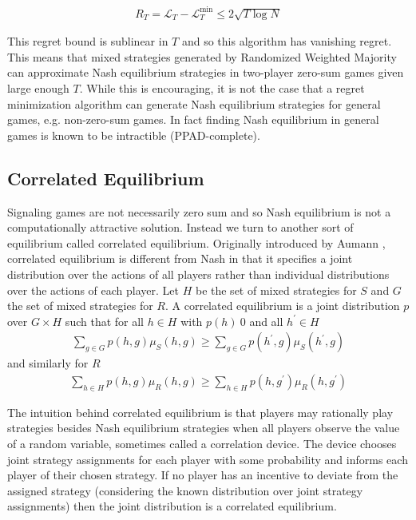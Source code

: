 \documentclass{article}
\begin{document}
\begin{align*}
R_T = \mathcal{L}_T - \mathcal{L}_T^{\text{min}} \le 2\sqrt{T \log N}
\end{align*}

This regret bound is sublinear in $T$ and so this algorithm has vanishing regret. This means that mixed strategies generated by Randomized Weighted Majority can approximate Nash equilibrium strategies in two-player zero-sum games given large enough $T$. While this is encouraging, it is not the case that a regret minimization algorithm can generate Nash equilibrium strategies for general games, e.g. non-zero-sum games. In fact finding Nash equilibrium in general games is known to be intractible (PPAD-complete\cite{daskalakis2009complexity}).

\subsection{Correlated Equilibrium}


Signaling games are not necessarily zero sum and so Nash equilibrium is not a computationally attractive solution. Instead we turn to another sort of equilibrium called correlated equilibrium. Originally introduced by Aumann \cite{aumann1974subjectivity}\cite{aumann1987correlated}, correlated equilibrium is different from Nash in that it specifies a joint distribution over the actions of all players rather than individual distributions over the actions of each player. Let $H$ be the set of mixed strategies for $S$ and $G$ the set of mixed strategies for $R$. A correlated equilibrium is a joint distribution $p$ over $G \times H$ such that for all $h\in H$ with $p(h) \> 0$ and all $h^\prime \in H$
\begin{align*}
\sum_{g \in G} p(h,g)\mu_S(h, g) \ge \sum_{g \in G} p(h^\prime,g)\mu_S(h^\prime, g)
\end{align*}
\noindent and similarly for $R$
\begin{align*}
\sum_{h \in H} p(h,g)\mu_R(h, g) \ge \sum_{h \in H} p(h,g^\prime)\mu_R(h, g^\prime)
\end{align*}

The intuition behind correlated equilibrium is that players may rationally play strategies besides Nash equilibrium strategies when all players observe the value of a random variable, sometimes called a correlation device. The device chooses joint strategy assignments for each player with some probability and informs each player of their chosen strategy. If no player has an incentive to deviate from the assigned strategy (considering the known distribution over joint strategy assignments) then the joint distribution is a correlated equilibrium.
\end{document}
